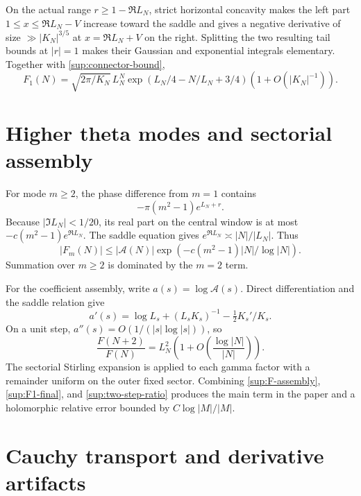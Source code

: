 \documentclass[10pt]{article}
\begin{document}
On the actual range $r\ge1-\Re L_N$, strict horizontal concavity makes the
left part $1\le x\le\Re L_N-V$ increase toward the saddle and gives a
negative derivative of size $\gg |K_N|^{3/5}$ at $x=\Re L_N+V$ on the
right.  Splitting the two resulting tail bounds at $|r|=1$ makes their
Gaussian and exponential integrals elementary.  Together with
\eqref{sup:connector-bound},
\begin{equation}\label{sup:F1-final}
 F_1(N)=\sqrt{2\pi/K_N}\,L_N^N
 \exp(L_N/4-N/L_N+3/4)
 \left(1+O(|K_N|^{-1})\right).
\end{equation}

\section{Higher theta modes and sectorial assembly}\label{sup:modes}

For mode $m\ge2$, the phase difference from $m=1$ contains
\begin{equation}\label{sup:mode-extra}
 -\pi(m^2-1)e^{L_N+r}.
\end{equation}
Because $|\Im L_N|<1/20$, its real part on the central window is at most
$-c(m^2-1)e^{\Re L_N}$.  The saddle equation gives
$e^{\Re L_N}\asymp|N|/|L_N|$.  Thus
\begin{equation}\label{sup:mode-bound}
 |F_m(N)|\le |\mathcal A(N)|
 \exp\left(-c(m^2-1)|N|/\log|N|\right).
\end{equation}
Summation over $m\ge2$ is dominated by the $m=2$ term.

For the coefficient assembly, write $a(s)=\log\mathcal A(s)$.  Direct
differentiation and the saddle relation give
\[
 a'(s)=\log L_s+(L_sK_s)^{-1}-\tfrac12K_s'/K_s.
\]
On a unit step, $a''(s)=O(1/(|s|\log|s|))$, so
\begin{equation}\label{sup:two-step-ratio}
 \frac{F(N+2)}{F(N)}=L_N^2
 \left(1+O\left(\frac{\log|N|}{|N|}\right)\right).
\end{equation}
The sectorial Stirling expansion is applied to each gamma factor with a
remainder uniform on the outer fixed sector.  Combining
\eqref{sup:F-assembly}, \eqref{sup:F1-final}, and
\eqref{sup:two-step-ratio} produces the main term in the paper and a
holomorphic relative error bounded by $C\log|M|/|M|$.

\section{Cauchy transport and derivative artifacts}\label{sup:derivatives}
\end{document}
